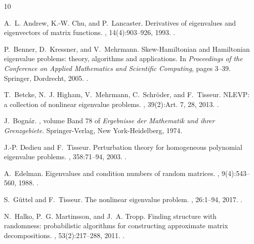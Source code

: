 \documentclass[a4paper,11pt]{article}
\begin{document}
\begin{thebibliography}{10}

A.~L. Andrew, K.-W. Chu, and P.~Lancaster.
\newblock Derivatives of eigenvalues and eigenvectors of matrix functions.
, 14(4):903--926, 1993.
\newblock \href {https://doi.org/10.1137/0614061} {}.

P.~Benner, D.~Kressner, and V.~Mehrmann.
\newblock Skew-{H}amiltonian and {H}amiltonian eigenvalue problems: theory, algorithms and applications.
\newblock In {\em Proceedings of the {C}onference on {A}pplied {M}athematics and {S}cientific {C}omputing}, pages 3--39. Springer, Dordrecht, 2005.
\newblock \href {https://doi.org/10.1007/1-4020-3197-1\_1} {}.

T.~Betcke, N.~J. Higham, V.~Mehrmann, C.~Schr\"oder, and F.~Tisseur.
\newblock N{LEVP}: a collection of nonlinear eigenvalue problems.
, 39(2):Art. 7, 28, 2013.
\newblock \href {https://doi.org/10.1145/2427023.2427024} {}.

J.~Bogn\'ar.
, volume Band 78 of {\em Ergebnisse der Mathematik und ihrer Grenzgebiete}.
\newblock Springer-Verlag, New York-Heidelberg, 1974.

J.-P. Dedieu and F.~Tisseur.
\newblock Perturbation theory for homogeneous polynomial eigenvalue problems.
, 358:71--94, 2003.
\newblock \href {https://doi.org/10.1016/S0024-3795(01)00423-2} {}.

A.~Edelman.
\newblock Eigenvalues and condition numbers of random matrices.
, 9(4):543--560, 1988.
\newblock \href {https://doi.org/10.1137/0609045} {}.

S.~G\"uttel and F.~Tisseur.
\newblock The nonlinear eigenvalue problem.
, 26:1--94, 2017.
\newblock \href {https://doi.org/10.1017/S0962492917000034} {}.

N.~Halko, P.~G. Martinsson, and J.~A. Tropp.
\newblock Finding structure with randomness: probabilistic algorithms for constructing approximate matrix decompositions.
, 53(2):217--288, 2011.
\newblock \href {https://doi.org/10.1137/090771806} {}.


\end{thebibliography}
\end{document}
